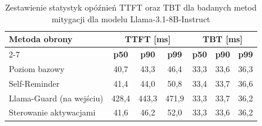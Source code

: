 \begin{table}[!htbp]
    \centering
    \renewcommand{\arraystretch}{1.2}
    \begin{tabular}{l|c|c|c|c|c|c}
        \hline
        \multirow{2}{*}{\textbf{Metoda obrony}} & \multicolumn{3}{c|}{\textbf{TTFT [ms]}} & \multicolumn{3}{c}{\textbf{TBT [ms]}}                                                             \\\cline{2-7}
                                                & \textbf{p50}                            & \textbf{p90}                          & \textbf{p99} & \textbf{p50} & \textbf{p90} & \textbf{p99} \\\hline
        Poziom bazowy                           & 40,7                                    & 43,3                                  & 46,4         & 33,3         & 33,6         & 36,3         \\\hline
        Self-Reminder                           & 41,4                                    & 44,0                                  & 50,8         & 33,4         & 33,7         & 36,6         \\\hline
        Llama-Guard (na wejściu)                & 428,4                                   & 443,3                                 & 471,9        & 33,3         & 33,7         & 36,2         \\\hline
        Sterowanie aktywacjami                  & 41,6                                    & 46,2                                  & 52,0         & 33,3         & 33,6         & 36,2         \\\hline
    \end{tabular}
    \caption{Zestawienie statystyk opóźnień TTFT oraz TBT dla badanych metod mitygacji dla modelu Llama-3.1-8B-Instruct}
    \label{tab:latency_metrics_llama}
\end{table}
